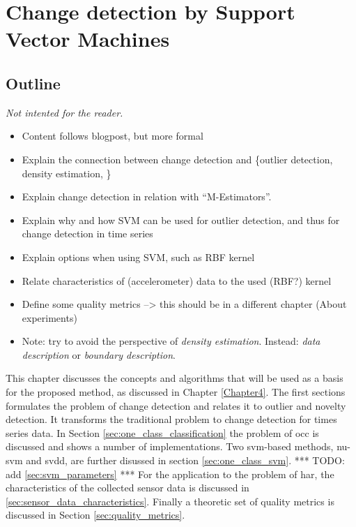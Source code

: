 
\chapter{Change detection by Support Vector Machines}

\label{Chapter3} %


\section{Outline}
\emph{Not intented for the reader.}
\begin{itemize}
  \item Content follows blogpost, but more formal
  \item Explain the connection between change detection and \{outlier detection, density estimation, \etc\}
  \item Explain change detection in relation with ``M-Estimators''.
  \item Explain why and how SVM can be used for outlier detection, and thus for change detection in time series
  \item Explain options when using SVM, such as RBF kernel
  \item Relate characteristics of (accelerometer) data to the used (RBF?) kernel
  \item Define some quality metrics --> this should be in a different chapter (About experiments)
  \item Note: try to avoid the perspective of \emph{density estimation}. Instead: \emph{data description} or \emph{boundary description}.
\end{itemize}

This chapter discusses the concepts and algorithms that will be used as a basis for the proposed method, as discussed in Chapter \ref{Chapter4}.
The first sections formulates the problem of change detection and relates it to outlier and novelty detection.
It transforms the traditional problem to change detection for times series data.
In Section \ref{sec:one_class_classification} the problem of \acrlong{occ} is discussed and shows a number of implementations.
Two \acrlong{svm}-based methods, \gls{nu-svm} and \gls{svdd}, are further disussed in section \ref{sec:one_class_svm}.
*** TODO: add \ref{sec:svm_parameters} ***
For the application to the problem of \acrlong{har}, the characteristics of the collected sensor data is discussed in \ref{sec:sensor_data_characteristics}.
Finally a theoretic set of quality metrics is discussed in Section \ref{sec:quality_metrics}.






